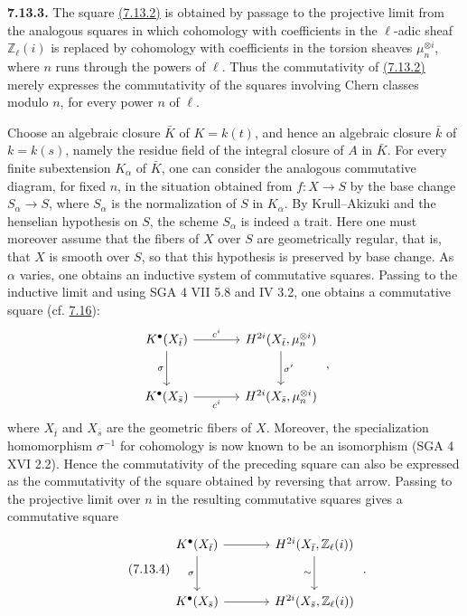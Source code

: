 \textbf{7.13.3.}
The square \hyperlink{sga6.e10.eq.7-13-2}{(7.13.2)} is obtained by passage to the projective limit from the
analogous squares in which cohomology with coefficients in the $\ell$-adic
sheaf $\mathbb Z_\ell(i)$ is replaced by cohomology with coefficients in the
torsion sheaves $\mu_n^{\otimes i}$, where $n$ runs through the powers of
$\ell$. Thus the commutativity of \hyperlink{sga6.e10.eq.7-13-2}{(7.13.2)} merely expresses the
commutativity of the squares involving Chern classes modulo $n$, for every
power $n$ of $\ell$.

Choose an algebraic closure $\bar K$ of $K=k(t)$, and hence an algebraic
closure $\bar k$ of $k=k(s)$, namely the residue field of the integral closure
of $A$ in $\bar K$. For every finite subextension $K_\alpha$ of $\bar K$, one
can consider the analogous commutative diagram, for fixed $n$, in the
situation obtained from $f:X\to S$ by the base change $S_\alpha\to S$, where
$S_\alpha$ is the normalization of $S$ in $K_\alpha$. By Krull--Akizuki and
the henselian hypothesis on $S$, the scheme $S_\alpha$ is indeed a trait.
Here one must moreover assume that the fibers of $X$ over $S$ are
geometrically regular, that is, that $X$ is smooth over $S$, so that this
hypothesis is preserved by base change. As $\alpha$ varies, one obtains an
inductive system of commutative squares. Passing to the inductive limit and
using SGA 4 VII 5.8 and IV 3.2, one obtains a commutative square (cf. \hyperlink{sga6.e10.sec.7.16}{7.16}):
\[
\begin{tikzcd}[column sep=large,row sep=large]
K^\bullet(X_{\bar t}) \arrow[r,"c^i"] \arrow[d,"\sigma"'] &
H^{2i}(X_{\bar t},\mu_n^{\otimes i}) \arrow[d,"\sigma'"]\\
K^\bullet(X_{\bar s}) \arrow[r,"c^i"'] &
H^{2i}(X_{\bar s},\mu_n^{\otimes i})
\end{tikzcd}
\;,
\]
where $X_{\bar t}$ and $X_{\bar s}$ are the geometric fibers of $X$.
Moreover, the specialization homomorphism $\sigma^{-1}$ for cohomology is
now known to be an isomorphism (SGA 4 XVI 2.2). Hence the commutativity of the
preceding square can also be expressed as the commutativity of the square
obtained by reversing that arrow. Passing to the projective limit over $n$ in
the resulting commutative squares gives a commutative square
\begin{equation}\tag{7.13.4}
\begin{tikzcd}[column sep=large,row sep=large]
K^\bullet(X_{\bar t}) \arrow[r] \arrow[d,"\sigma"'] &
H^{2i}(X_{\bar t},\mathbb Z_\ell(i)) \arrow[d,"\sim"']\\
K^\bullet(X_{\bar s}) \arrow[r] &
H^{2i}(X_{\bar s},\mathbb Z_\ell(i))
\end{tikzcd}
\;.
\end{equation}

